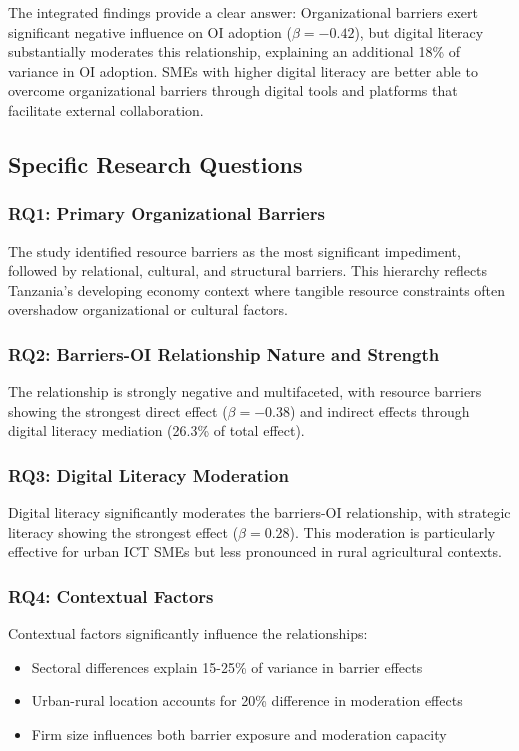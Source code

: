 The integrated findings provide a clear answer: Organizational barriers exert significant negative influence on OI adoption ($\beta = -0.42$), but digital literacy substantially moderates this relationship, explaining an additional 18\% of variance in OI adoption. SMEs with higher digital literacy are better able to overcome organizational barriers through digital tools and platforms that facilitate external collaboration.

\subsection{Specific Research Questions}

\subsubsection{RQ1: Primary Organizational Barriers}
The study identified resource barriers as the most significant impediment, followed by relational, cultural, and structural barriers. This hierarchy reflects Tanzania's developing economy context where tangible resource constraints often overshadow organizational or cultural factors.

\subsubsection{RQ2: Barriers-OI Relationship Nature and Strength}
The relationship is strongly negative and multifaceted, with resource barriers showing the strongest direct effect ($\beta = -0.38$) and indirect effects through digital literacy mediation (26.3\% of total effect).

\subsubsection{RQ3: Digital Literacy Moderation}
Digital literacy significantly moderates the barriers-OI relationship, with strategic literacy showing the strongest effect ($\beta = 0.28$). This moderation is particularly effective for urban ICT SMEs but less pronounced in rural agricultural contexts.

\subsubsection{RQ4: Contextual Factors}
Contextual factors significantly influence the relationships:
\begin{itemize}
    \item Sectoral differences explain 15-25\% of variance in barrier effects
    \item Urban-rural location accounts for 20\% difference in moderation effects
    \item Firm size influences both barrier exposure and moderation capacity
\end{itemize}

